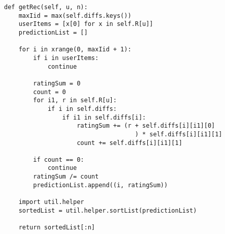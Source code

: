 \begin{lstlisting}
def getRec(self, u, n):
    maxIid = max(self.diffs.keys())
    userItems = [x[0] for x in self.R[u]]
    predictionList = []

    for i in xrange(0, maxIid + 1):
        if i in userItems:
            continue

        ratingSum = 0
        count = 0
        for i1, r in self.R[u]:
            if i in self.diffs:
                if i1 in self.diffs[i]:
                    ratingSum += (r + self.diffs[i][i1][0]
                                    ) * self.diffs[i][i1][1]
                    count += self.diffs[i][i1][1]

        if count == 0:
            continue
        ratingSum /= count
        predictionList.append((i, ratingSum))

    import util.helper
    sortedList = util.helper.sortList(predictionList)

    return sortedList[:n]
\end{lstlisting}
